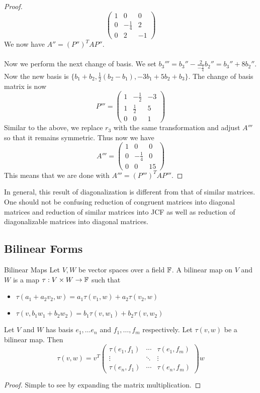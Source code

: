 \documentclass[a4paper]{article}
\begin{document}
\begin{eg}{}{}
\begin{proof}
$$\begin{pmatrix}
1 & 0 & 0\\
0 & -\frac{1}{4} & 2\\
0 & 2 & -1
\end{pmatrix}$$
We now have $A''=(P'')^TAP''$. \\~\\
Now we perform the next change of basis. We set $b_3'''=b_3''-\frac{2}{-\frac{1}{4}}b_2''=b_3''+8b_2''$. Now the new basis is $\{b_1+b_2,\frac{1}{2}(b_2-b_1),-3b_1+5b_2+b_3\}$. The change of basis matrix is now $$P'''=\begin{pmatrix}
1 & -\frac{1}{2} & -3\\
1 & \frac{1}{2} & 5\\
0 & 0 & 1
\end{pmatrix}$$ Similar to the above, we replace $r_3$ with the same transformation and adjust $A'''$ so that it remains symmetric. Thus now we have $$A'''=\begin{pmatrix}
1 & 0 & 0\\
0 & -\frac{1}{4} & 0\\
0 & 0 & 15
\end{pmatrix}$$
This means that we are done with $A'''=(P''')^TAP'''$. 
\end{proof}
\end{eg}

In general, this result of diagonalization is different from that of similar matrices. One should not be confusing reduction of congruent matrices into diagonal matrices and reduction of similar matrices into JCF as well as reduction of diagonalizable matrices into diagonal matrices. 

\subsection{Bilinear Forms}
\begin{defn}{Bilinear Maps}{} Let $V,W$ be vector spaces over a field $\mathbb{F}$. A bilinear map on $V$ and $W$ is a map $\tau:V\times W\to\mathbb{F}$ such that 
\begin{itemize}
\item $\tau(a_1+a_2v_2,w)=a_1\tau(v_1,w)+a_2\tau(v_2,w)$
\item $\tau(v,b_1w_1+b_2w_2)=b_1\tau(v,w_1)+b_2\tau(v,w_2)$
\end{itemize}
\end{defn}

\begin{thm}{}{} Let $V$ and $W$ has basis $e_1,\dots e_n$ and $f_1,\dots,f_m$ respectively. Let $\tau(v,w)$ be a bilinear map. Then $$\tau(v,w)=v^T\begin{pmatrix}
\tau(e_1,f_1) & \cdots & \tau(e_1,f_m)\\
\vdots & \ddots & \vdots\\
\tau(e_n,f_1) & \cdots & \tau(e_n,f_m)
\end{pmatrix}w$$ \tcbline
\begin{proof}
Simple to see by expanding the matrix multiplication. 
\end{proof}
\end{thm}
\end{document}
